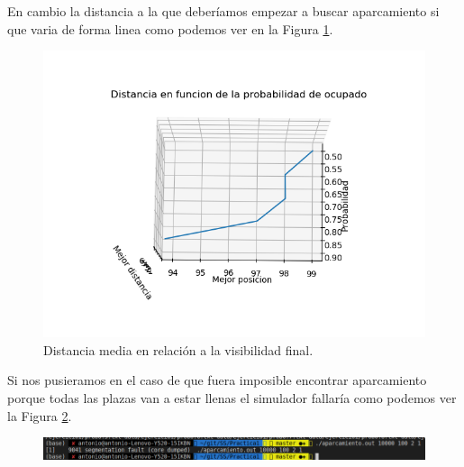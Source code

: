 \documentclass[12pt,a4paper]{article}
\begin{document}
En cambio la distancia a la que deberíamos empezar a buscar aparcamiento si que varia de forma linea como podemos ver en la Figura \ref{fig:distProbabilidad2}.
\begin{figure}[H]
	\centering
	\includegraphics{images/prob2.png}
	\caption{Distancia media en relación a la visibilidad final.}
	\label{fig:distProbabilidad2}
\end{figure}
Si nos pusieramos en el caso de que fuera imposible encontrar aparcamiento porque todas las plazas van a estar llenas el simulador fallaría como podemos ver la Figura \ref{fig:falloej1}.
\begin{figure}[H]
	\centering
	\includegraphics[width=0.7\linewidth]{images/falloej1}
	\caption{}
	\label{fig:falloej1}
\end{figure}
\end{document}
